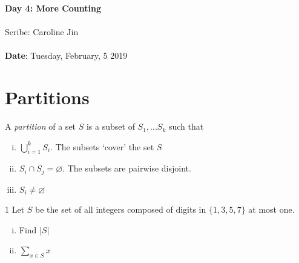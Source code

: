 \documentclass[11pt,twosided]{article}
\def\titlestring{Day 4: More Counting}
\def\scribestring{Caroline Jin}
\def\datestring{Tuesday, February, 5 2019}
\begin{document}
\thispagestyle{plain}  %

\noindent
{\LARGE \textbf{\titlestring}}\\\\
%
{\Large Scribe: \scribestring}\\ \\
{\textbf{Date}: \datestring}


\noindent

\section{Partitions}
    A \textit{partition} of a set $S$ is a subset of $S_1, ... S_k$ such that
\begin{enumerate}[(i)]
        \item $\bigcup\limits_{i=1}^{k} S_{i}$. The subsets `cover' the set $S$
        \item $S_i 	\cap S_j = \varnothing$. The subsets are pairwise disjoint.
        \item $S_i \neq \varnothing$
\end{enumerate}

\begin{problem}
    1 Let $S$ be the set of all integers composed of digits in $\{1, 3, 5, 7\}$ at most one.
    
    \begin{enumerate}[(i)]
        \item Find $|S|$
        \item $\sum\limits_{x \in S} x$
    \end{enumerate}
\end{problem}
\end{document}
